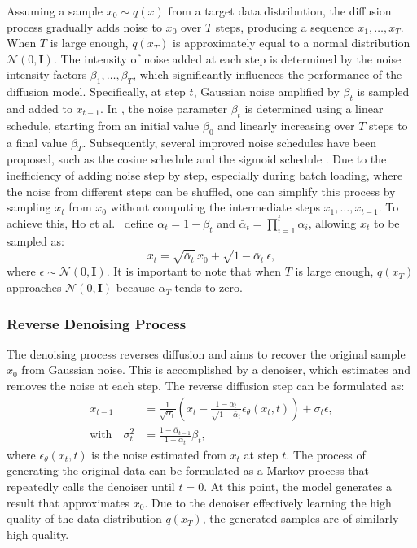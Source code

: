 \documentclass[conference]{IEEEtran}
\begin{document}
Assuming a sample $x_0 \sim q(x)$ from a target data distribution, the diffusion process gradually adds noise to $x_0$ over $T$ steps, producing a sequence $x_1, \ldots, x_T$.
When $T$ is large enough, $q(x_T)$ is approximately equal to a normal distribution $\mathcal{N}(0, \mathbf{I})$.
The intensity of noise added at each step is determined by the noise intensity factors $\beta_1, \ldots, \beta_T$, which significantly influences the performance of the diffusion model.
Specifically, at step $t$, Gaussian noise amplified by $\beta_t$ is sampled and added to $x_{t-1}$.
In \cite{xyan}, the noise parameter $\beta_t$ is determined using a linear schedule, starting from an initial value $\beta_0$ and linearly increasing over $T$ steps to a final value $\beta_T$.
Subsequently, several improved noise schedules have been proposed, such as the cosine schedule \cite{yliao} and the sigmoid schedule \cite{jho2022}.
Due to the inefficiency of adding noise step by step, especially during batch loading, where the noise from different steps can be shuffled, one can simplify this process by sampling $x_t$ from $x_0$ without computing the intermediate steps $x_1, \ldots, x_{t-1}$.
To achieve this, Ho et al.\ \cite{xyan} define $\alpha_t = 1 - \beta_t$ and $\bar{\alpha}_t = \prod_{i=1}^{t} \alpha_i$, allowing $x_t$ to be sampled as:
\begin{equation}
  x_t = \sqrt{\bar{\alpha}_t}\, x_0 + \sqrt{1 - \bar{\alpha}_t}\, \epsilon,
  \label{eq:forward}
\end{equation}
where $\epsilon \sim \mathcal{N}(0, \mathbf{I})$.
It is important to note that when $T$ is large enough, $q(x_T)$ approaches $\mathcal{N}(0, \mathbf{I})$ because $\bar{\alpha}_T$ tends to zero.

\subsubsection{Reverse Denoising Process}

The denoising process reverses diffusion and aims to recover the original sample $x_0$ from Gaussian noise.
This is accomplished by a denoiser, which estimates and removes the noise at each step.
The reverse diffusion step can be formulated as:
\begin{align}
  x_{t-1} &= \frac{1}{\sqrt{\alpha_t}} \left( x_t - \frac{1 - \alpha_t}{\sqrt{1 - \bar{\alpha}_t}} \epsilon_\theta(x_t, t) \right) + \sigma_t \epsilon, \nonumber \\
  \text{with}\quad \sigma_t^2 &= \frac{1 - \bar{\alpha}_{t-1}}{1 - \bar{\alpha}_t} \beta_t,
  \label{eq:reverse}
\end{align}
where $\epsilon_\theta(x_t, t)$ is the noise estimated from $x_t$ at step $t$.
The process of generating the original data can be formulated as a Markov process that repeatedly calls the denoiser until $t = 0$.
At this point, the model generates a result that approximates $x_0$.
Due to the denoiser effectively learning the high quality of the data distribution $q(x_T)$, the generated samples are of similarly high quality.
\end{document}
